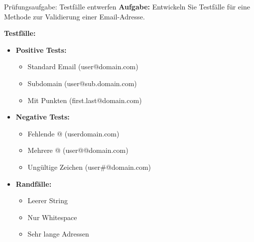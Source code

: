 \begin{example}{Prüfungsaufgabe: Testfälle entwerfen}
\textbf{Aufgabe:}
Entwickeln Sie Testfälle für eine Methode zur Validierung einer Email-Adresse.

\textbf{Testfälle:}
\begin{itemize}
    \item \textbf{Positive Tests:}
    \begin{itemize}
        \item Standard Email (user@domain.com)
        \item Subdomain (user@sub.domain.com)
        \item Mit Punkten (first.last@domain.com)
    \end{itemize}
    
    \item \textbf{Negative Tests:}
    \begin{itemize}
        \item Fehlende @ (userdomain.com)
        \item Mehrere @ (user@@domain.com)
        \item Ungültige Zeichen (user\#@domain.com)
    \end{itemize}
    
    \item \textbf{Randfälle:}
    \begin{itemize}
        \item Leerer String
        \item Nur Whitespace
        \item Sehr lange Adressen
    \end{itemize}
\end{itemize}
\end{example}